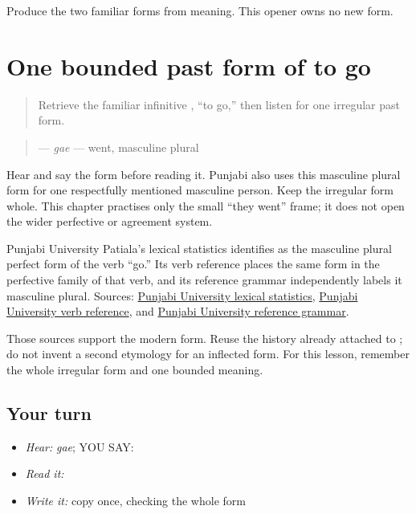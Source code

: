 \begin{tcolorbox}[breakable,colback=teal!4,colframe=teal!35!black,title={Before you move on}]
Produce the two familiar forms from meaning. This opener owns no new form.
\end{tcolorbox}
\section[\texorpdfstring{\pa{ਗਏ} (gae)}{ਗਏ (gae)}]{One bounded past form of to go}

\label{lesson:PA-C206-gae}



\begin{quote}
Retrieve the familiar infinitive \textbf{}, “to go,” then listen for one irregular past form.
\end{quote}

\begin{grammarlens}[title={Grammar Lens: direct owner}]
\begin{quote}
\textbf{} — \emph{gae} — went, masculine plural
\end{quote}

Hear and say the form before reading it. Punjabi also uses this masculine plural form for one respectfully mentioned masculine person. Keep the irregular form whole. This chapter practises only the small “they went” frame; it does not open the wider perfective or agreement system.
\end{grammarlens}

\begin{cousinweb}
Punjabi University Patiala's lexical statistics identifies \textbf{} as the masculine plural perfect form of the verb “go.” Its verb reference places the same form in the perfective family of that verb, and its reference grammar independently labels it masculine plural. Sources: \href{https://www.learnpunjabi.org/statistics.html}{Punjabi University lexical statistics}, \href{https://www.learnpunjabi.org/Verb.html}{Punjabi University verb reference}, and \href{https://pt.learnpunjabi.org/assets/a\%20reference\%20grammar\_final.pdf}{Punjabi University reference grammar}.

Those sources support the modern form. Reuse the history already attached to \textbf{}; do not invent a second etymology for an inflected form. For this lesson, remember the whole irregular form and one bounded meaning.
\end{cousinweb}

\subsection*{Your turn}
\begin{itemize}
\raggedright
  \item \emph{Hear:} \emph{gae}; YOU SAY: \textbf{}
  \item \emph{Read it:} \textbf{}
  \item \emph{Write it:} copy \textbf{} once, checking the whole form
\end{itemize}


